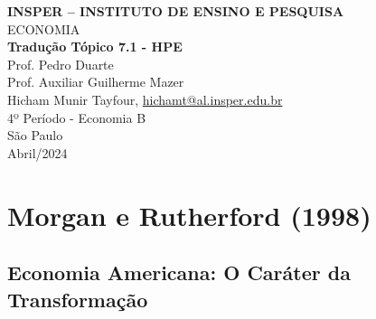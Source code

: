 \documentclass[a4paper,12pt]{article}[abntex2]
\begin{document}
\begin{titlepage}
    \centering
    \vspace*{1cm}
    \Large\textbf{INSPER – INSTITUTO DE ENSINO E PESQUISA}\\
    \Large ECONOMIA\\
    \vspace{1.5cm}
    \Large\textbf{Tradução Tópico 7.1 - HPE}\\
    \vspace{1.5cm}
    Prof. Pedro Duarte\\
    Prof. Auxiliar Guilherme Mazer\\
    \vfill
    \normalsize
    Hicham Munir Tayfour, \href{mailto:hichamt@al.insper.edu.br}{hichamt@al.insper.edu.br}\\
    4º Período - Economia B\\
    \vfill
    São Paulo\\
    Abril/2024
\end{titlepage}

\newpage
\tableofcontents
\thispagestyle{empty} %
\newpage
\setcounter{page}{1} %
\justify
\onehalfspacing

\pagestyle{fancy}
\fancyhf{}
\rhead{\thepage}

\section{\textbf{Morgan e Rutherford (1998)}}
\subsection{\textbf{Economia Americana: O Caráter da Transformação}}
\end{document}
